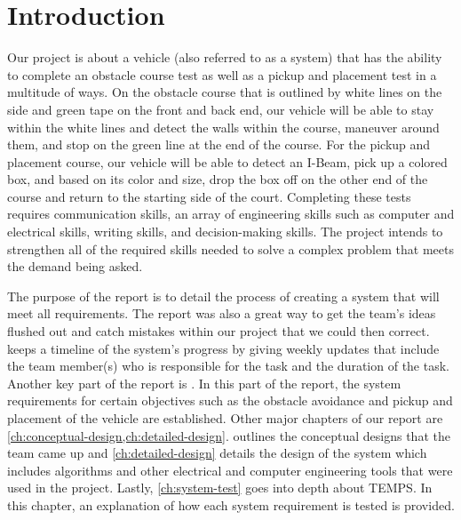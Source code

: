 \documentclass{report}
\begin{document}
\chapter{Introduction}\label{ch:introduction}

Our project is about a vehicle (also referred to as a system) that has the ability to complete an obstacle course test as well as a pickup and placement test in a multitude of ways. On the obstacle course that is outlined by white lines on the side and green tape on the front and back end, our vehicle will be able to stay within the white lines and detect the walls within the course, maneuver around them, and stop on the green line at the end of the course. For the pickup and placement course, our vehicle will be able to detect an I-Beam, pick up a colored box, and based on its color and size, drop the box off on the other end of the course and return to the starting side of the court. Completing these tests requires communication skills, an array of engineering skills such as computer and electrical skills, writing skills, and decision-making skills. The project intends to strengthen all of the required skills needed to solve a complex problem that meets the demand being asked.

The purpose of the report is to detail the process of creating a system that will meet all requirements. The report was also a great way to get the team’s ideas flushed out and catch mistakes within our project that we could then correct.  keeps a timeline of the system’s progress by giving weekly updates that include the team member(s) who is responsible for the task and the duration of the task. Another key part of the report is . In this part of the report, the system requirements for certain objectives such as the obstacle avoidance and pickup and placement of the vehicle are established. Other major chapters of our report are \cref{ch:conceptual-design,ch:detailed-design}.  outlines the conceptual designs that the team came up and \cref{ch:detailed-design} details the design of the system which includes algorithms and other electrical and computer engineering tools that were used in the project. Lastly, \cref{ch:system-test} goes into depth about \gls{TEMPS}. In this chapter, an explanation of how each system requirement is tested is provided.
\end{document}
